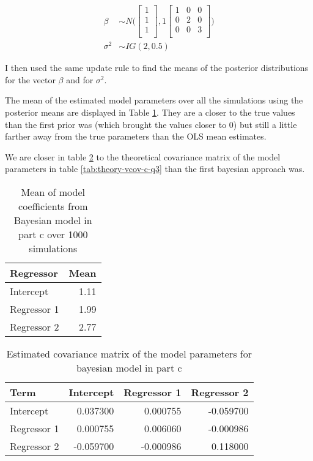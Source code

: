 \documentclass[]{book}
\begin{document}
\begin{align}
  \beta &\sim N \bigg( 
  \begin{bmatrix}
  1\\
  1\\
  1\\
  \end{bmatrix},
  1 \begin{bmatrix}
  1 & 0 & 0\\
  0 & 2 & 0\\
  0 & 0 & 3\\
  \end{bmatrix} \bigg)\\
  \sigma^2 &\sim IG(2, 0.5)
\end{align}

I then used the same update rule to find the means of the posterior distributions for the vector \(\beta\) and for \(\sigma^2\).

The mean of the estimated model parameters over all the simulations using the posterior means are displayed in Table \ref{tab:bayes-c-mean-coefs-q3}. They are a closer to the true values than the first prior was (which brought the values closer to 0) but still a little farther away from the true parameters than the OLS mean estimates.

We are closer in table \ref{tab:bayes-c-est-vcov-q3} to the theoretical covariance matrix of the model parameters in table \ref{tab:theory-vcov-c-q3} than the first bayesian approach was.

\begin{table}

\caption{\label{tab:bayes-c-mean-coefs-q3}Mean of model coefficients from Bayesian model in part c over 1000 simulations}
\centering
\begin{tabular}[t]{lr}
\toprule
Regressor & Mean\\
\midrule
Intercept & 1.11\\
Regressor 1 & 1.99\\
Regressor 2 & 2.77\\
\bottomrule
\end{tabular}
\end{table}

\begin{table}

\caption{\label{tab:bayes-c-est-vcov-q3}Estimated covariance matrix of the model parameters for bayesian model in part c}
\centering
\begin{tabular}[t]{lrrr}
\toprule
Term & Intercept & Regressor 1 & Regressor 2\\
\midrule
Intercept & 0.037300 & 0.000755 & -0.059700\\
Regressor 1 & 0.000755 & 0.006060 & -0.000986\\
Regressor 2 & -0.059700 & -0.000986 & 0.118000\\
\bottomrule
\end{tabular}
\end{table}
\end{document}
